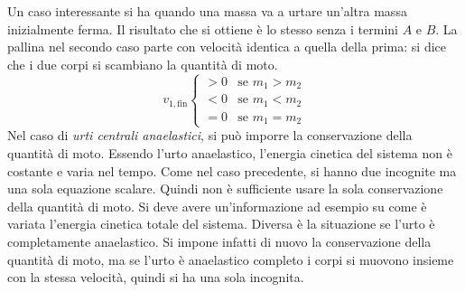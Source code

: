 \documentclass[10pt,a4paper]{book}
\begin{document}
\begin{figure}[htpb]
\end{figure}
\FloatBarrier
Un caso interessante si ha quando una massa va a urtare un'altra massa inizialmente ferma. Il risultato che si ottiene è lo stesso senza i termini $A$ e $B$. La pallina nel secondo caso parte con velocità identica a quella della prima: si dice che i due corpi si scambiano la quantità di moto.
\[
	v_{1,\text{fin}} \begin{cases}  >0 & \text{se $m_1>m_2$} \\ <0 & \text{se $m_1<m_2$} \\ =0 &\text{se $m_1=m_2$} \end{cases}
\]
Nel caso di \textit{urti centrali anaelastici}, si può imporre la conservazione della quantità di moto. Essendo l'urto anaelastico, l'energia cinetica del sistema non è costante e varia nel tempo. Come nel caso precedente, si hanno due incognite ma una sola equazione scalare. Quindi non è sufficiente usare la sola conservazione della quantità di moto. Si deve avere un'informazione ad esempio su come è variata l'energia cinetica totale del sistema. Diversa è la situazione se l'urto è completamente anaelastico. Si impone infatti di nuovo la conservazione della quantità di moto, ma se l'urto è anaelastico completo i corpi si muovono insieme con la stessa velocità, quindi si ha una sola incognita.
\end{document}
